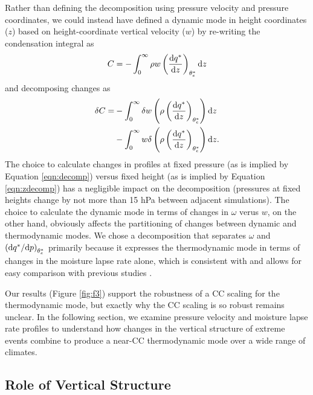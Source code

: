 \documentclass[twocol]{ametsoc}
\begin{document}
Rather than defining the decomposition using pressure velocity and pressure coordinates, we could instead have defined a dynamic mode in height coordinates ($z$) based on height-coordinate vertical velocity ($w$) by re-writing the condensation integral as
\begin{equation}
    C = - \int_{0}^{\infty} \rho w \left (\frac{{\rm d}q^*}{{\rm d}z} \right )_{\theta_e^*} {\rm d}z
\end{equation}
and decomposing changes as
\begin{equation} \label{eqn:zdecomp}
\begin{split}
	\delta C = &-\int_{0}^{\infty} \delta w \left ( \rho \left (\frac{{\rm d}q^*}{{\rm d}z} \right )_{\theta_e^*} \right ) {\rm d}z \\
	&- \int_{0}^{\infty} w \delta \left ( \rho \left (\frac{{\rm d}q^*}{{\rm d}z} \right )_{\theta_e^*} \right ) {\rm d}z.
\end{split}
\end{equation}
The choice to calculate changes in profiles at fixed pressure (as is implied by Equation \ref{eqn:decomp}) versus fixed height (as is implied by Equation \ref{eqn:zdecomp}) has a negligible impact on the decomposition (pressures at fixed heights change by not more than 15 hPa between adjacent simulations). The choice to calculate the dynamic mode in terms of changes in $\omega$ verus $w$, on the other hand, obviously affects the partitioning of changes between dynamic and thermodynamic modes. We chose a decomposition that separates $\omega$ and $\left({\rm d}q^*/{\rm d}p\right)_{\theta_e^*}$ primarily because it expresses the thermodynamic mode in terms of changes in the moisture lapse rate alone, which is consistent with and allows for easy comparison with previous studies \citep[e.g.][]{Ogorman2009ScalingGCM,OGorman2009TheChange,Muller2011IntensificationModel,Muller2013ImpactWarming, Fildier2017SimultaneousChange}.

Our results (Figure \ref{fig:f3}) support the robustness of a CC scaling for the thermodynamic mode, but exactly why the CC scaling is so robust remains unclear. In the following section, we examine pressure velocity and moisture lapse rate profiles to understand how changes in the vertical structure of extreme events combine to produce a near-CC thermodynamic mode over a wide range of climates.

\subsection{Role of Vertical Structure}
\end{document}
